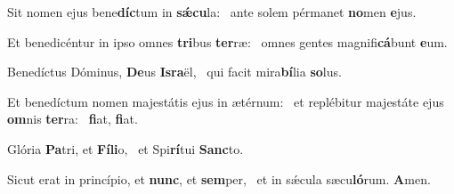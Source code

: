 \item Sit nomen ejus bene\textbf{díc}tum in \textbf{sǽ}\textbf{cu}la:~\psstar{} ante solem pérmanet \textbf{no}men \textbf{e}jus.
\item Et benedicéntur in ipso omnes \textbf{tri}bus \textbf{ter}ræ:~\psstar{} omnes gentes magnifi\textbf{cá}bunt \textbf{e}um.
\item Benedíctus Dóminus, \textbf{De}us \textbf{Is}\textbf{ra}ël,~\psstar{} qui facit mira\textbf{bí}lia \textbf{so}lus.
\item Et benedíctum nomen majestátis ejus in ætérnum:~\pscross{} et replébitur majestáte ejus \textbf{om}nis \textbf{ter}ra:~\psstar{} \textbf{fi}at, \textbf{fi}at.
\item Glória \textbf{Pa}tri, et \textbf{Fí}\textbf{li}o,~\psstar{} et Spi\textbf{rí}tui \textbf{Sanc}to.
\item Sicut erat in princípio, et \textbf{nunc}, et \textbf{sem}per,~\psstar{} et in sǽcula sæcu\textbf{ló}rum. \textbf{A}men.

